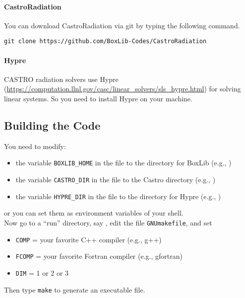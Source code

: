 \documentclass[11pt,letterpaper]{article}
\begin{document}
\paragraph{CastroRadiation} You can download CastroRadiation via git
by typing the following command.
\vspace{5pt}

\verb|git clone https://github.com/BoxLib-Codes/CastroRadiation|

\paragraph{Hypre} CASTRO radiation solvers use Hypre
(\url{https://computation.llnl.gov/casc/linear_solvers/sls_hypre.html})
for solving linear systems.  So you need to install Hypre on your
machine.

\subsection{Building the Code}

You need to modify:
\begin{itemize}
\item the variable {\tt BOXLIB\_HOME} in the file
  {\tt{}} to the
  directory for BoxLib (e.g., {\tt{}})
\item the variable {\tt CASTRO\_DIR} in the file
  {\tt{}} to
  the Castro directory
  (e.g., {\tt{}})
\item the variable {\tt HYPRE\_DIR} in the file
  {\tt{}} to
  the directory for Hypre (e.g., {\tt{}})
\end{itemize}
or you can set them as environment variables of your shell.  \\


Now go to a ``run'' directory, say
{\tt{}},
edit the file {\tt GNUmakefile}, and set
\begin{itemize}
\item {\tt COMP} = your favorite C++ compiler (e.g., g++)
\item {\tt FCOMP} = your favorite Fortran compiler (e.g., gfortran)
\item {\tt DIM}   = 1 or 2 or 3
\end{itemize}
Then type {\tt make} to generate an executable file.  
\end{document}
